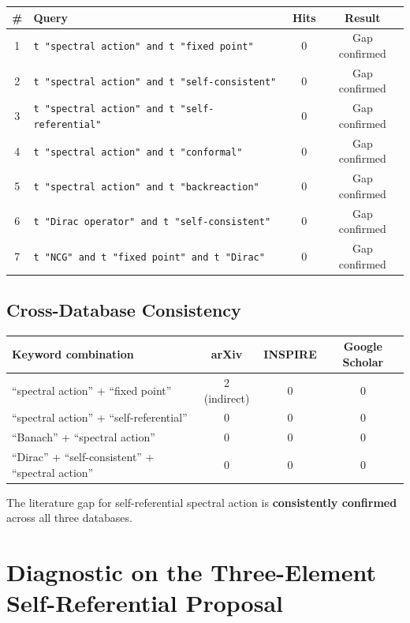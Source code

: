 \documentclass[11pt,a4paper]{article}
\theoremstyle{remark}
\begin{document}
\begin{table}[h]
\centering
\begin{tabular}{clcc}
\toprule
\# & Query & Hits & Result \\
\midrule
1 & \texttt{t "spectral action" and t "fixed point"} & 0 & Gap confirmed \\
2 & \texttt{t "spectral action" and t "self-consistent"} & 0 & Gap confirmed \\
3 & \texttt{t "spectral action" and t "self-referential"} & 0 & Gap confirmed \\
4 & \texttt{t "spectral action" and t "conformal"} & 0 & Gap confirmed \\
5 & \texttt{t "spectral action" and t "backreaction"} & 0 & Gap confirmed \\
6 & \texttt{t "Dirac operator" and t "self-consistent"} & 0 & Gap confirmed \\
7 & \texttt{t "NCG" and t "fixed point" and t "Dirac"} & 0 & Gap confirmed \\
\bottomrule
\end{tabular}
\end{table}

\subsection{Cross-Database Consistency}

\begin{table}[h]
\centering
\begin{tabular}{lccc}
\toprule
Keyword combination & arXiv & INSPIRE & Google Scholar \\
\midrule
``spectral action'' + ``fixed point'' & 2 (indirect) & 0 & 0 \\
``spectral action'' + ``self-referential'' & 0 & 0 & 0 \\
``Banach'' + ``spectral action'' & 0 & 0 & 0 \\
``Dirac'' + ``self-consistent'' + ``spectral action'' & 0 & 0 & 0 \\
\bottomrule
\end{tabular}
\end{table}

The literature gap for self-referential spectral action is \textbf{consistently confirmed} across all three databases.

\appendix
\section{Diagnostic on the Three-Element Self-Referential Proposal}
\end{document}

